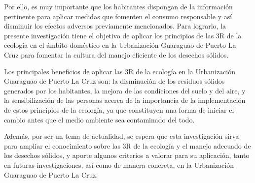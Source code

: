 Por ello, es muy importante que los habitantes dispongan de la información pertinente para aplicar medidas que fomenten el consumo responsable y así disminuir los efectos adversos previamente mencionados. Para lograrlo, la presente investigación tiene el objetivo de aplicar los principios de las 3R de la ecología en el ámbito doméstico en la Urbanización Guaraguao de Puerto La Cruz para fomentar la cultura del manejo eficiente de los desechos sólidos.

Los principales beneficios de aplicar las 3R de la ecología en la Urbanización Guaraguao de Puerto La Cruz son: la disminución de los residuos sólidos generados por los habitantes, la mejora de las condiciones del suelo y del aire, y la sensibilización de las personas acerca de la importancia de la implementación de estos principios de la ecología, ya que constituyen una forma de iniciar el cambio antes que el medio ambiente sea contaminado del todo.
 
Además, por ser un tema de actualidad, se espera que esta investigación sirva para ampliar el conocimiento sobre las 3R de la ecología y el manejo adecuado de los desechos sólidos, y aporte algunos criterios a valorar para su aplicación, tanto en futuras investigaciones, así como de manera concreta, en la Urbanización Guaraguao de Puerto La Cruz.

\newpage
